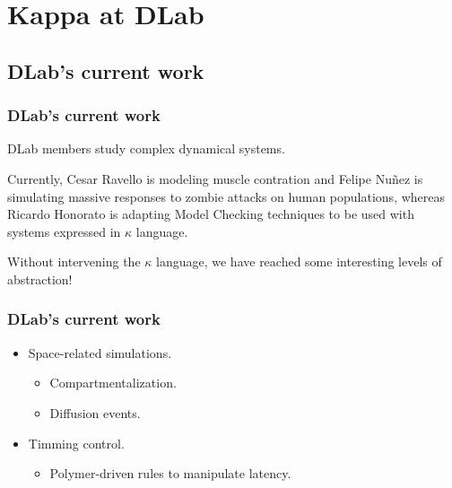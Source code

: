 \documentclass[xcolor=dvipsnames]{beamer}
\begin{document}
\section{Kappa at DLab}
\subsection{DLab's current work}
\begin{frame}
  \frametitle{DLab's current work}
  \begin{flushleft}
    DLab members study complex dynamical systems.
    \newline \pause
    \item Currently, Cesar Ravello is modeling muscle contration and Felipe Nuñez is simulating massive responses to zombie attacks on human populations, whereas Ricardo Honorato is adapting Model Checking techniques to be used with systems expressed in $\kappa$ language.
    \newline \pause
    \item Without intervening the $\kappa$ language, we have reached some interesting levels of abstraction!
  \end{flushleft}
\end{frame}

\begin{frame}
  \frametitle{DLab's current work}
  \begin{itemize}
    \item Space-related simulations.
    \begin{itemize}
      \item Compartmentalization.
      \pause
      \item Diffusion events.
      \newline
    \end{itemize}
    \pause
    \item Timming control.
    \begin{itemize}
      \item Polymer-driven rules to manipulate latency.
    \end{itemize}
  \end{itemize}
\end{frame}
\end{document}
